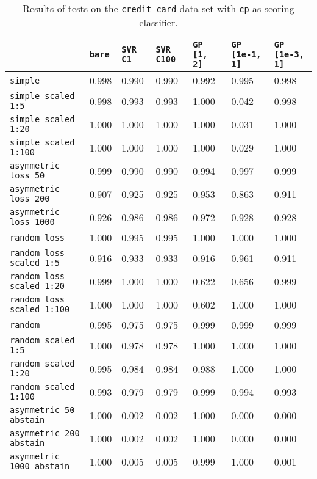\begin{table}
{\scriptsize
\begin{tabu}{l|l|l|l|l|l|l}
&\texttt{bare} &\texttt{SVR C1} &\texttt{SVR C100} &\texttt{GP [1, 2]} &\texttt{GP [1e-1, 1]} &\texttt{GP [1e-3, 1]}  \\
\hline
\texttt{simple} &0.998 &0.990 &0.990 &0.992 &0.995 &0.998 \\
\texttt{simple scaled 1:5} &0.998 &0.993 &0.993 &1.000 &0.042 &0.998 \\
\texttt{simple scaled 1:20} &1.000 &1.000 &1.000 &1.000 &0.031 &1.000 \\
\texttt{simple scaled 1:100} &1.000 &1.000 &1.000 &1.000 &0.029 &1.000 \\
\texttt{asymmetric loss 50} &0.999 &0.990 &0.990 &0.994 &0.997 &0.999 \\
\texttt{asymmetric loss 200} &0.907 &0.925 &0.925 &0.953 &0.863 &0.911 \\
\texttt{asymmetric loss 1000} &0.926 &0.986 &0.986 &0.972 &0.928 &0.928 \\
\texttt{random loss} &1.000 &0.995 &0.995 &1.000 &1.000 &1.000 \\
\texttt{random loss scaled 1:5} &0.916 &0.933 &0.933 &0.916 &0.961 &0.911 \\
\texttt{random loss scaled 1:20} &0.999 &1.000 &1.000 &0.622 &0.656 &0.999 \\
\texttt{random loss scaled 1:100} &1.000 &1.000 &1.000 &0.602 &1.000 &1.000 \\
\texttt{random} &0.995 &0.975 &0.975 &0.999 &0.999 &0.999 \\
\texttt{random scaled 1:5} &1.000 &0.978 &0.978 &1.000 &1.000 &1.000 \\
\texttt{random scaled 1:20} &0.995 &0.984 &0.984 &0.988 &1.000 &1.000 \\
\texttt{random scaled 1:100} &0.993 &0.979 &0.979 &0.999 &0.994 &0.993 \\
\texttt{asymmetric 50 abstain} &1.000 &0.002 &0.002 &1.000 &0.000 &0.000 \\
\texttt{asymmetric 200 abstain} &1.000 &0.002 &0.002 &1.000 &0.000 &0.000 \\
\texttt{asymmetric 1000 abstain} &1.000 &0.005 &0.005 &0.999 &1.000 &0.001 \\
\end{tabu} }
\caption{Results of tests on the \texttt{credit card} data set
         with \texttt{cp} as scoring classifier.}
\end{table}

